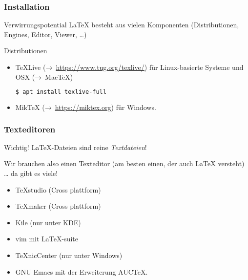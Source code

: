 \documentclass{cms-kurs}
\begin{document}
\begin{frame}[fragile]
  \frametitle{Installation}

  \onslide<+->

  \begin{block}{Verwirrungspotential}
    \LaTeX{} besteht aus vielen Komponenten (Distributionen, Engines, Editor,
    Viewer, \ldots)
  \end{block}

  \onslide<+->

  \bigskip{}

  \begin{block}{Distributionen}
    \begin{itemize}
    \item \TeX{}Live (→ \url{https://www.tug.org/texlive/}) für
      Linux-basierte Systeme und OSX (→ Mac\TeX)
\begin{lstlisting}[language=Bash]
$ apt install texlive-full
\end{lstlisting}
    \item Mik\TeX{} (→ \url{https://miktex.org}) für Windows.
    \end{itemize}
  \end{block}

\end{frame}

\begin{frame}
  \frametitle{Texteditoren}

  \onslide<+->

  \begin{block}{Wichtig!}
    \LaTeX-Dateien sind reine \emph{Textdateien}!
  \end{block}

  \onslide<+->

  Wir brauchen also einen Texteditor (am besten einen, der auch \LaTeX{}
  versteht) \dots{} \onslide<+-> da gibt es viele!
  \begin{itemize}
  \item TeXstudio (Cross plattform)
  \item TeXmaker  (Cross plattform)
  \item Kile      (nur unter KDE)
  \item vim mit LaTeX-suite
  \item TeXnicCenter (nur unter Windows)
  \item GNU Emacs mit der Erweiterung AUCTeX.
  \end{itemize}

\end{frame}
\end{document}
